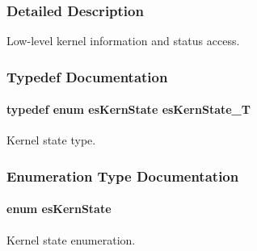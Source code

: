 \subsubsection{Detailed Description}
Low-\/level kernel information and status access. 

\subsubsection{Typedef Documentation}
\hypertarget{group__kern__ctrl_gab5edef44fe53303f96dc5e9f567babaf}{
\paragraph[{es\-Kern\-State\-\_\-\-T}]{\setlength{\rightskip}{0pt plus 5cm}typedef enum {\bf es\-Kern\-State} {\bf es\-Kern\-State\-\_\-\-T}}}\label{group__kern__ctrl_gab5edef44fe53303f96dc5e9f567babaf}


Kernel state type. 



\subsubsection{Enumeration Type Documentation}
\hypertarget{group__kern__ctrl_gac9be6bfeddbd6af148cdb3867fbc24af}{
\paragraph[{es\-Kern\-State}]{\setlength{\rightskip}{0pt plus 5cm}enum {\bf es\-Kern\-State}}}\label{group__kern__ctrl_gac9be6bfeddbd6af148cdb3867fbc24af}


Kernel state enumeration. 

